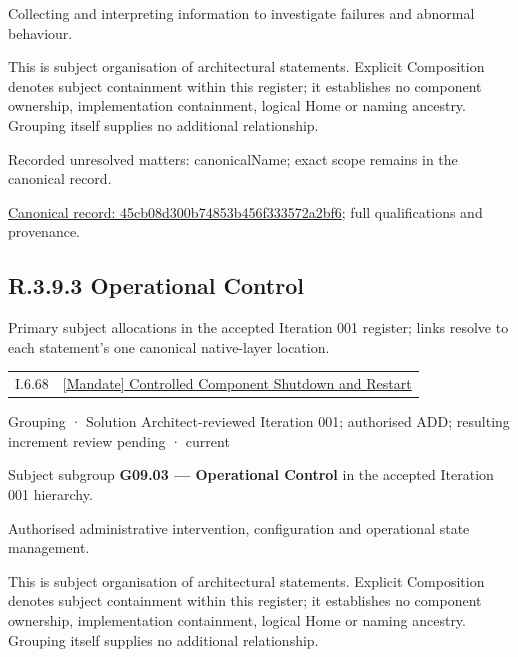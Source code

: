 Collecting and interpreting information to investigate failures and abnormal behaviour.



This is subject organisation of architectural statements. Explicit Composition denotes subject containment within this register; it establishes no component ownership, implementation containment, logical Home or naming ancestry. Grouping itself supplies no additional relationship.


{\small Recorded unresolved matters: canonicalName; exact scope remains in the canonical record.}\par
{\footnotesize \href{../../../../continuum/grouping/45cb08d300b74853b456f333572a2bf6.md}{Canonical record: 45cb08d300b74853b456f333572a2bf6}; full qualifications and provenance.}\par
\subsection*{R.3.9.3 Operational Control}
\label{navigation:R.3.9.3}

Primary subject allocations in the accepted Iteration 001 register; links resolve to each statement’s one canonical native-layer location.\par
\begin{longtable}{p{.22\linewidth}p{.73\linewidth}}
I.6.68 & \hyperref[element:96f7bfa320b049d2b76fcc35a1926883]{[Mandate] Controlled Component Shutdown and Restart} \\
\end{longtable}
\label{element:f0402eea7b5a49f9b61fbd90e336b2de}
{\small Grouping · Solution Architect-reviewed Iteration 001; authorised ADD; resulting increment review pending · current}\par

Subject subgroup \textbf{G09.03 — Operational Control} in the accepted Iteration 001 hierarchy.



Authorised administrative intervention, configuration and operational state management.



This is subject organisation of architectural statements. Explicit Composition denotes subject containment within this register; it establishes no component ownership, implementation containment, logical Home or naming ancestry. Grouping itself supplies no additional relationship.


